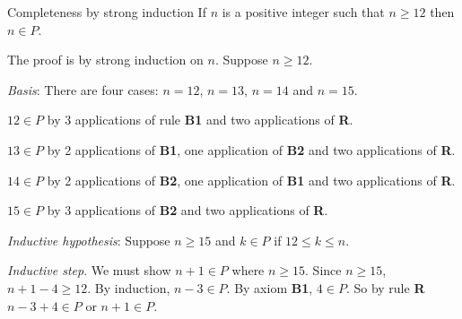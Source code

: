 \begin{wideslide}[bm=,toc=]{Completeness by strong induction}
If $n$ is a positive integer such that $n\geq 12$ then $n\in P$.

\vspace{1em}
The proof is by strong induction on $n$.
Suppose $n\geq 12$.

\vspace{1em}
{\em Basis\/}: There are four cases: $n=12$, $n=13$, $n=14$ and $n=15$.

\vspace{1em}
$12\in P$ by 3 applications of rule {\bf B1} and two applications of {\bf R}.

$13\in P$ by 2 applications of {\bf B1}, one application of {\bf B2} and two applications of {\bf R}.

$14\in P$ by 2 applications of {\bf B2}, one application of {\bf B1} and two applications of {\bf R}.

$15\in P$ by 3 applications of {\bf B2} and two applications of {\bf R}.

\vspace{1em}
{\em Inductive hypothesis\/}:  Suppose $n\geq 15$ and $k\in P$ if $12\leq k \leq n$.

\vspace{1em}
{\em Inductive step}.
We must show $n+1\in P$ where $n\geq 15$.
Since $n\geq 15$, $n+1-4\geq 12$.
By induction, $n-3\in P$.
By axiom {\bf B1}, $4\in P$.
So by rule {\bf R} $n-3+4\in P$ or $n+1\in P$.
\end{wideslide}

